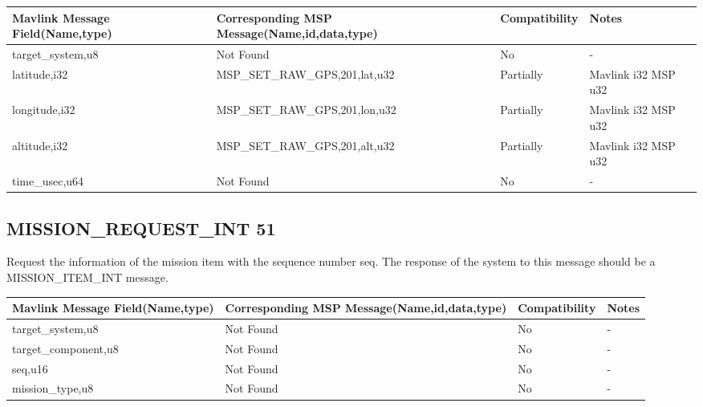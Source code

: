 {
\centering
\begin{tabular}{ |p{4cm  } |p{7cm} | p{2cm}|m{5em}|}
\hline
Mavlink Message Field(Name,type)&Corresponding MSP Message(Name,id,data,type)& Compatibility & Notes\\
\hline
target\_system,u8 & Not Found & No & - \\
\hline
\rowcolor{lightgray}
latitude,i32 & MSP\_SET\_RAW\_GPS,201,lat,u32 & Partially & Mavlink i32 MSP u32 \\
\hline
\rowcolor{lightgray}
longitude,i32 & MSP\_SET\_RAW\_GPS,201,lon,u32& Partially &Mavlink i32 MSP u32 \\
\hline
\rowcolor{lightgray}
altitude,i32 & MSP\_SET\_RAW\_GPS,201,alt,u32 & Partially & Mavlink i32 MSP u32 \\
\hline
time\_usec,u64 & Not Found & No & - \\
\end{tabular}
}
\cleardoublepage


\subsection{MISSION\_REQUEST\_INT 51} 
Request the information of the mission item with the sequence number seq. The response of the system to this message should be a MISSION\_ITEM\_INT message. \\
{
\centering
\begin{tabular}{ |p{4cm  } |p{7cm} | p{2cm}|m{5em}|}
\hline
Mavlink Message Field(Name,type)&Corresponding MSP Message(Name,id,data,type)& Compatibility & Notes\\
\hline
target\_system,u8 & Not Found & No & - \\
\hline
target\_component,u8 & Not Found & No & - \\
\hline
seq,u16 & Not Found & No & - \\
\hline
mission\_type,u8 & Not Found & No & - \\
\end{tabular}
}
\cleardoublepage




